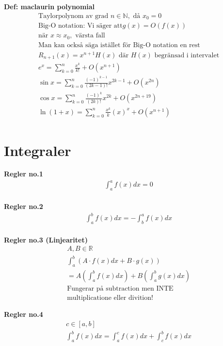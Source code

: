 \begin{multicols}{2}
\textbf{Def: maclaurin polynomial}
\begin{align*}
  &\text{Taylorpolynom av grad } n \in \mathbb{N}, \text{ då } x_0=0 \\
  &\text{Big-O notation: Vi säger att} g(x)=O(f(x)) \\
  &\text{när } x \approx x_0, \text{ värsta fall} \\
  &\text{Man kan också säga istället för Big-O notation en rest} \\
  &R_{n+1}(x)=x^{n+1}H(x) \text{ där } H(x) \text{ begränsad i intervalet} \\
  &e^x=\displaystyle\sum_{k=0}^{n}\frac{x^k}{k!}+O(x^{n+1}) \\
  &\sin{x}=\displaystyle\sum_{k=0}^{n}\frac{{(-1)}^{k-1}}{(2k-1)!}x^{2k-1}+O(x^{2n}) \\
  &\cos{x}=\displaystyle\sum_{k=0}^{n}\frac{{(-1)}^{k}}{(2k)!}x^{2k}+O(x^{2n+19}) \\
  &\ln{(1+x)}=\displaystyle\sum_{k=0}^{n}\frac{x^k}{k}{(x)}^x+O(x^{n+1}) \\
\end{align*}


\section{Integraler}

\textbf{Regler no.1}
\begin{align*}
  &\int_a^a f(x)dx=0  \\
\end{align*}

\textbf{Regler no.2}
\begin{align*}
  &\int_a^b f(x)dx = -\int_b^a f(x)dx  \\
\end{align*}

\textbf{Regler no.3 (Linjearitet)}
\begin{align*}
  &A,B \in \mathbb{R} \\
  &\int_a^b (A \cdot f(x) dx + B \cdot g(x)) \\
  &= A(\int_a^b f(x) dx) + B(\int_a^b g(x) dx) \\
  &\text{Fungerar på subtraction men INTE} \\
  &\text{multiplicatione eller divition!}
\end{align*}

\textbf{Regler no.4}
\begin{align*}
  &c \in [a,b] \\
  &\int_a^b f(x)dx = \int_a^c f(x)dx + \int_c^b f(x)dx \\
\end{align*}


\end{multicols}

